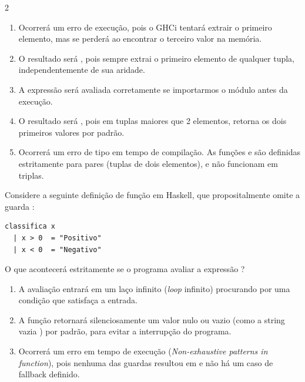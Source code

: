 \documentclass[a4paper,10pt,brazil]{article}
\begin{document}
\begin{multicols}{2}
\begin{enumerate}
  \item Ocorrerá um erro de execução, pois o GHCi tentará extrair o primeiro elemento, mas se perderá ao encontrar o terceiro valor na memória.

  \item O resultado será , pois  sempre extrai o primeiro elemento de qualquer tupla, independentemente de sua aridade.

  \item A expressão será avaliada corretamente se importarmos o módulo  antes da execução.

  \item O resultado será , pois em tuplas maiores que 2 elementos,  retorna os dois primeiros valores por padrão.

  \item Ocorrerá um erro de tipo em tempo de compilação. As funções  e  são definidas estritamente para pares (tuplas de dois elementos), e não funcionam em triplas.


\end{enumerate}

Considere a seguinte definição de função em Haskell, que propositalmente omite a guarda :

\begin{verbatim}
classifica x
  | x > 0  = "Positivo"
  | x < 0  = "Negativo"
\end{verbatim}

O que acontecerá estritamente se o programa avaliar a expressão ?

\begin{enumerate}
  \item A avaliação entrará em um laço infinito (\emph{loop} infinito) procurando por uma condição que satisfaça a entrada.

  \item A função retornará silenciosamente um valor nulo ou vazio (como a string vazia ) por padrão, para evitar a interrupção do programa.

  \item Ocorrerá um erro em tempo de execução (\emph{Non-exhaustive patterns in function}), pois nenhuma das guardas resultou em  e não há um caso de fallback definido.


\end{enumerate}
\end{multicols}
\end{document}
